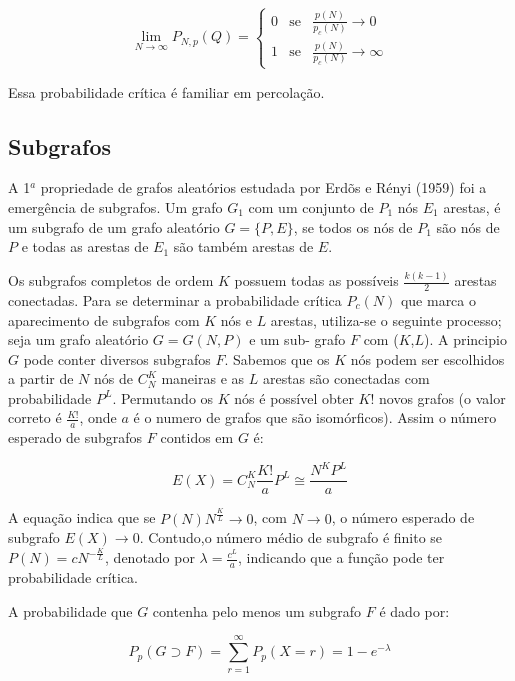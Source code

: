 \documentclass[brazil,ruledheader]{abnt}
\begin{document}
\begin{equation}
 \lim_{N\rightarrow \infty}P_{N,p}(Q)=\left\{\begin{array}{rcl}0 &
\mbox{se}&  \frac{p(N)}{p_c(N)}\rightarrow 0\\1 & \mbox{se}&
\frac{p(N)}{p_c(N)}\rightarrow \infty\end{array}\right.
\end{equation}

Essa probabilidade crítica é familiar em percolação.

\subsection{Subgrafos}

A 1$^a$ propriedade de grafos aleatórios estudada por Erdõs e Rényi (1959) foi a
emergência de subgrafos. Um grafo $G_1$ com um conjunto de $P_1$ nós $E_1$
arestas, é um subgrafo de um grafo aleatório $G=\{P,E\}$, se
todos os nós de $P_1$ são nós de $P$ e todas as arestas de $E_1$ são também
arestas de $E$. 

Os subgrafos completos de ordem $K$ possuem  todas as possíveis
$\frac{k(k-1)}{2}$ arestas conectadas. Para se determinar a probabilidade
crítica $P_c(N)$ que marca o aparecimento de subgrafos com $K$
nós e $L$ arestas, utiliza-se o seguinte processo; seja um grafo aleatório
$G=G(N,P)$ e um sub- grafo $F$ com ($K$,$L$). A principio $G$
pode conter diversos subgrafos $F$. Sabemos que os $K$ nós podem ser escolhidos
a partir de $N$ nós de $C_N^K$ maneiras e as $L$ arestas são conectadas com
probabilidade $P^L$. Permutando os $K$ nós é possível obter $K!$  novos grafos
(o valor correto é $\frac{K!}{a}$, onde $a$ é o numero de grafos que são
isomórficos). Assim o número esperado de subgrafos $F$ contidos em $G$ é:

\begin{equation}
E(X)=C^K_N\frac{K!}{a}P^L \cong \frac{N^KP^L}{a}
\end{equation}

A equação indica que se $P(N)N^{\frac{K}{L}}\rightarrow 0$, com $N\rightarrow
0$,
o
número esperado de subgrafo $E(X)\rightarrow 0$. Contudo,o número médio de
subgrafo é finito se
$P(N)=cN^{-\frac{K}{L}}$,  denotado por
$\lambda =\frac{c^L}{a}$, indicando que a função pode ter probabilidade crítica.

A probabilidade que $G$ contenha pelo menos um subgrafo $F$ é dado por:

\begin{equation}
P_p(G\supset F)=\sum_{r=1}^\infty P_p(X=r)=1-e^{-\lambda}
\end{equation}
\end{document}
